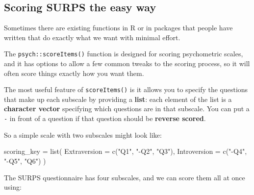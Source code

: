 \documentclass[
]{book}
\newenvironment{Shaded}{\begin{snugshade}}{\end{snugshade}}
\newcommand{\AttributeTok}[1]{\textcolor[rgb]{0.77,0.63,0.00}{#1}}
\newcommand{\FunctionTok}[1]{\textcolor[rgb]{0.00,0.00,0.00}{#1}}
\newcommand{\NormalTok}[1]{#1}
\newcommand{\OtherTok}[1]{\textcolor[rgb]{0.56,0.35,0.01}{#1}}
\newcommand{\StringTok}[1]{\textcolor[rgb]{0.31,0.60,0.02}{#1}}
\begin{document}
\hypertarget{scoring-surps-the-easy-way}{%
\subsection{Scoring SURPS the easy way}\label{scoring-surps-the-easy-way}}

Sometimes there are existing functions in R or in packages that people
have written that do exactly what we want with minimal effort.

The \texttt{psych::scoreItems()} function is designed for scoring psychometric
scales, and it has options to allow a few common tweaks to the scoring
process, so it will often score things exactly how you want them.

The most useful feature of \texttt{scoreItems()} is it allows you to specify the questions
that make up each subscale by providing a \textbf{list}: each element
of the list is a \textbf{character vector} specifying which questions
are in that subscale. You can put a \texttt{-} in front of a question
if that question should be \textbf{reverse scored}.

So a simple scale with two subscales might look like:

\begin{Shaded}
\begin{Highlighting}[]
\NormalTok{scoring\_key }\OtherTok{=} \FunctionTok{list}\NormalTok{(}
    \AttributeTok{Extraversion =} \FunctionTok{c}\NormalTok{(}\StringTok{"Q1"}\NormalTok{, }\StringTok{"{-}Q2"}\NormalTok{, }\StringTok{"Q3"}\NormalTok{),}
    \AttributeTok{Introversion =} \FunctionTok{c}\NormalTok{(}\StringTok{"{-}Q4"}\NormalTok{, }\StringTok{"{-}Q5"}\NormalTok{, }\StringTok{"Q6"}\NormalTok{)}
\NormalTok{)}
\end{Highlighting}
\end{Shaded}

The SURPS questionnaire has four subscales, and we can score them all at once
using:
\end{document}
